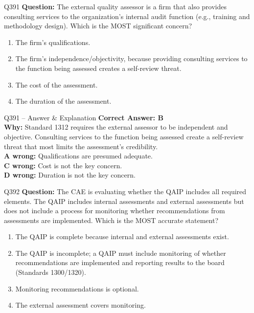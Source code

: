 \documentclass[aspectratio=169,10pt]{beamer}
\begin{document}
	\begin{frame}[t]{Q391}
		\small
		\textbf{Question:} The external quality assessor is a firm that also provides consulting services to the organization's internal audit function (e.g., training and methodology design). Which is the MOST significant concern?
		\begin{enumerate}[label=\Alph*.,itemsep=1pt,topsep=2pt]
			\item The firm's qualifications.
			\item The firm's independence/objectivity, because providing consulting services to the function being assessed creates a self-review threat.
			\item The cost of the assessment.
			\item The duration of the assessment.
		\end{enumerate}
	\end{frame}
	
	\begin{frame}[t]{Q391 -- Answer \& Explanation}
		\small
		\textbf{Correct Answer: B} \\[4pt]
		\textbf{Why:} Standard 1312 requires the external assessor to be independent and objective. Consulting services to the function being assessed create a self-review threat that most limits the assessment's credibility. \\[4pt]
		\textbf{A wrong:} Qualifications are presumed adequate. \\[2pt]
		\textbf{C wrong:} Cost is not the key concern. \\[2pt]
		\textbf{D wrong:} Duration is not the key concern.
	\end{frame}
	
	\begin{frame}[t]{Q392}
		\small
		\textbf{Question:} The CAE is evaluating whether the QAIP includes all required elements. The QAIP includes internal assessments and external assessments but does not include a process for monitoring whether recommendations from assessments are implemented. Which is the MOST accurate statement?
		\begin{enumerate}[label=\Alph*.,itemsep=1pt,topsep=2pt]
			\item The QAIP is complete because internal and external assessments exist.
			\item The QAIP is incomplete; a QAIP must include monitoring of whether recommendations are implemented and reporting results to the board (Standards 1300/1320).
			\item Monitoring recommendations is optional.
			\item The external assessment covers monitoring.
		\end{enumerate}
	\end{frame}
	
\end{document}
